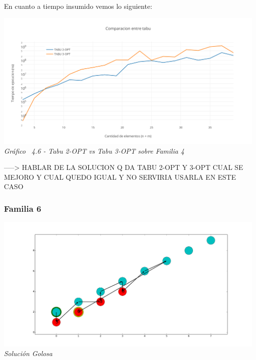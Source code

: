 En cuanto a tiempo insumido vemos lo siguiente:

\vspace*{0.3cm} \vspace*{0.3cm}
  \begin{center}
 \includegraphics[scale=0.5]{./EJ4/comparaciongym01.png}\\
 {            \textit{Gráfico \ 4.6 - Tabu 2-OPT vs Tabu 3-OPT sobre Familia 4}}
  \end{center}
  \vspace*{0.3cm}

  
-----> HABLAR DE LA SOLUCION Q DA TABU 2-OPT Y 3-OPT CUAL SE MEJORO Y CUAL QUEDO IGUAL Y NO SERVIRIA USARLA EN ESTE CASO

\subsubsection*{Familia 6}


\vspace*{0.3cm} \vspace*{0.3cm}
  \begin{center}
 \includegraphics[scale=0.3]{./EJ4/fam6goloso.png}\\
 {            \textit{Soluci\'on Golosa}}
  \end{center}
  \vspace*{0.3cm}

